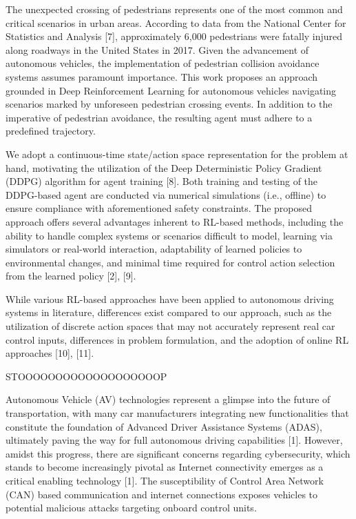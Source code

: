 The unexpected crossing of pedestrians represents one of the most common and critical scenarios in urban areas. According to data from the National Center for Statistics and Analysis [7], approximately 6,000 pedestrians were fatally injured along roadways in the United States in 2017. Given the advancement of autonomous vehicles, the implementation of pedestrian collision avoidance systems assumes paramount importance. This work proposes an approach grounded in Deep Reinforcement Learning for autonomous vehicles navigating scenarios marked by unforeseen pedestrian crossing events. In addition to the imperative of pedestrian avoidance, the resulting agent must adhere to a predefined trajectory.

We adopt a continuous-time state/action space representation for the problem at hand, motivating the utilization of the Deep Deterministic Policy Gradient (DDPG) algorithm for agent training [8]. Both training and testing of the DDPG-based agent are conducted via numerical simulations (i.e., offline) to ensure compliance with aforementioned safety constraints. The proposed approach offers several advantages inherent to RL-based methods, including the ability to handle complex systems or scenarios difficult to model, learning via simulators or real-world interaction, adaptability of learned policies to environmental changes, and minimal time required for control action selection from the learned policy [2], [9].

While various RL-based approaches have been applied to autonomous driving systems in literature, differences exist compared to our approach, such as the utilization of discrete action spaces that may not accurately represent real car control inputs, differences in problem formulation, and the adoption of online RL approaches [10], [11].


STOOOOOOOOOOOOOOOOOOOP

Autonomous Vehicle (AV) technologies represent a glimpse into the future of transportation, with many car manufacturers integrating new functionalities that constitute the foundation of Advanced Driver Assistance Systems (ADAS), ultimately paving the way for full autonomous driving capabilities [1]. However, amidst this progress, there are significant concerns regarding cybersecurity, which stands to become increasingly pivotal as Internet connectivity emerges as a critical enabling technology [1]. The susceptibility of Control Area Network (CAN) based communication and internet connections exposes vehicles to potential malicious attacks targeting onboard control units.

